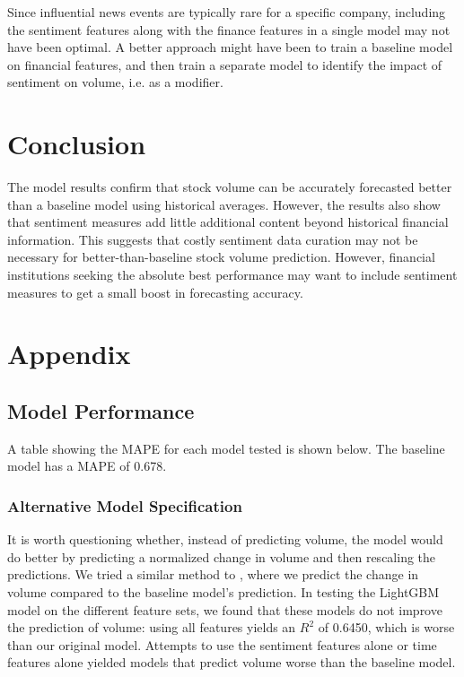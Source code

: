 \documentclass[12pt]{article}
\begin{document}
Since influential news events are typically rare for a specific company, including the sentiment features along with the finance features in a single model may not have been optimal. A better approach might have been to train a baseline model on financial features, and then train a separate model to identify the impact of sentiment on volume, i.e. as a modifier.

\section{Conclusion}
\label{section:conclusion}
The model results confirm that stock volume can be accurately forecasted better than a baseline model using historical averages. However, the results also show that sentiment measures add little additional content beyond historical financial information. This suggests that costly sentiment data curation may not be necessary for better-than-baseline stock volume prediction. However, financial institutions seeking the absolute best performance may want to include sentiment measures to get a small boost in forecasting accuracy.

\newpage
\printbibliography
\newpage

\section{Appendix}
\subsection{Model Performance}
\label{section:appendix_model_performance}
A table showing the MAPE for each model tested is shown below. The baseline model has a MAPE of 0.678.


\subsubsection{Alternative Model Specification}
It is worth questioning whether, instead of predicting volume, the model would do better by predicting a normalized change in volume and then rescaling the predictions. We tried a similar method to \textcite{goyenko2024trading}, where we predict the change in volume compared to the baseline model's prediction. In testing the LightGBM model on the different feature sets, we found that these models do not improve the prediction of volume: using all features yields an $R^2$ of 0.6450, which is worse than our original model. Attempts to use the sentiment features alone or time features alone yielded models that predict volume worse than the baseline model.
\end{document}

